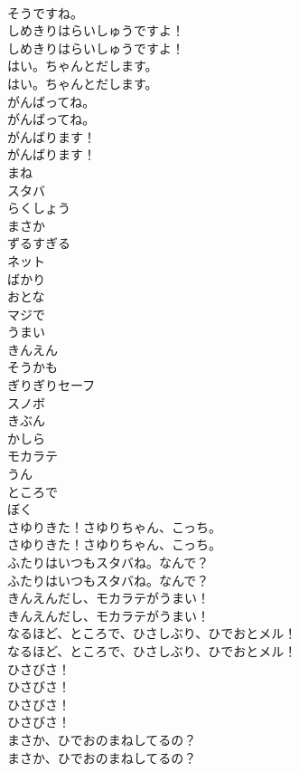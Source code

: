 \documentclass[8pt]{extreport}
\begin{document}
\begin{CJK}{UTF8}{min}
\\	そうですね。 
\\	しめきりはらいしゅうですよ！	
\\	しめきりはらいしゅうですよ！ 
\\	はい。ちゃんとだします。	
\\	はい。ちゃんとだします。 
\\	がんばってね。	
\\	がんばってね。 
\\	がんばります！	
\\	がんばります！ 
\\	まね
\\	スタバ
\\	らくしょう
\\	まさか
\\	ずるすぎる
\\	ネット
\\	ばかり
\\	おとな
\\	マジで
\\	うまい
\\	きんえん
\\	そうかも
\\	ぎりぎりセーフ
\\	スノボ
\\	きぶん
\\	かしら
\\	モカラテ
\\	うん
\\	ところで
\\	ぼく
\\	さゆりきた！さゆりちゃん、こっち。	
\\	さゆりきた！さゆりちゃん、こっち。 
\\	ふたりはいつもスタバね。なんで？	
\\	ふたりはいつもスタバね。なんで？ 
\\	きんえんだし、モカラテがうまい！	
\\	きんえんだし、モカラテがうまい！ 
\\	なるほど、ところで、ひさしぶり、ひでおとメル！	
\\	なるほど、ところで、ひさしぶり、ひでおとメル！ 
\\	ひさびさ！	
\\	ひさびさ！ 
\\	ひさびさ！	
\\	ひさびさ！ 
\\	まさか、ひでおのまねしてるの？	
\\	まさか、ひでおのまねしてるの？ 

\end{CJK}
\end{document}
